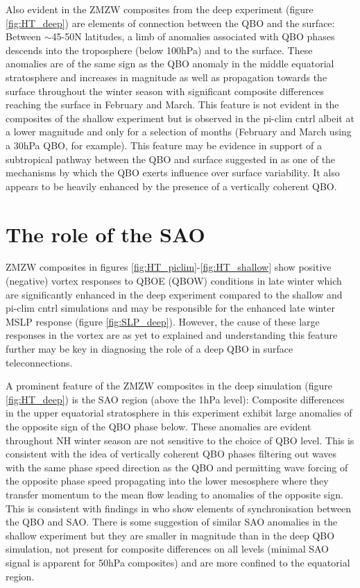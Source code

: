 Also evident in the ZMZW composites from the deep experiment (figure \ref{fig:HT_deep}) are elements of connection between the QBO and the surface: Between $\sim$45-50N latitudes, a limb of anomalies associated with QBO phases descends into the troposphere (below 100hPa) and to the surface. These anomalies are of the same sign as the QBO anomaly in the middle equatorial stratosphere and increases in magnitude as well as propagation towards the surface throughout the winter season with significant composite differences reaching the surface in February and March. This feature is not evident in the composites of the shallow experiment but is observed in the pi-clim cntrl albeit at a lower magnitude and only for a selection of months (February and March using a 30hPa QBO, for example). This feature may be evidence in support of a subtropical pathway between the QBO and surface suggested in \cite{graySurface2018b} as one of the mechanisms by which the QBO exerts influence over surface variability. It also appears to be heavily enhanced by the presence of a vertically coherent QBO.

\section{The role of the SAO}
ZMZW composites in figures \ref{fig:HT_piclim}-\ref{fig:HT_shallow} show positive (negative) vortex responses to QBOE (QBOW) conditions in late winter which are significantly enhanced in the deep experiment compared to the shallow and pi-clim cntrl simulations and may be responsible for the enhanced late winter MSLP response (figure \ref{fig:SLP_deep}). However, the cause of these large responses in the vortex are as yet to explained and understanding this feature further may be key in diagnosing the role of a deep QBO in surface teleconnections.

A prominent feature of the ZMZW composites in the deep simulation (figure \ref{fig:HT_deep}) is the SAO region (above the 1hPa level): Composite differences in the upper equatorial stratosphere in this experiment exhibit large anomalies of the opposite sign of the QBO phase below. These anomalies are evident throughout NH winter season are not sensitive to the choice of QBO level. This is consistent with the idea of vertically coherent QBO phases filtering out waves with the same phase speed direction as the QBO and permitting wave forcing of the opposite phase speed propagating into the lower mesosphere where they transfer momentum to the mean flow leading to anomalies of the opposite sign. This is consistent with findings in \citep{kuaiNonstationary2009c} who show elements of synchronisation between the QBO and SAO. There is some suggestion of similar SAO anomalies in the shallow experiment but they are smaller in magnitude than in the deep QBO simulation, not present for composite differences on all levels (minimal SAO signal is apparent for 50hPa composites) and are more confined to the equatorial region.

